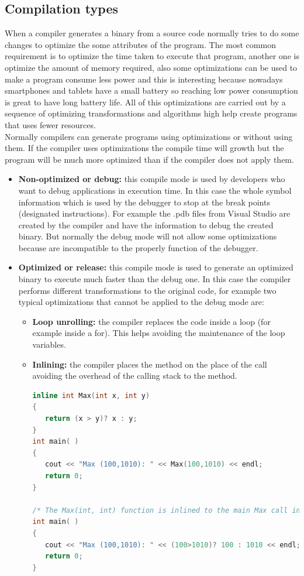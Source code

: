\subsection{Compilation types}\label{SS:PERF-GPIO-comptypes}
When a compiler generates a binary from a source code normally tries to do some changes to optimize the some attributes of the program. The most common requirement is to optimize the time taken to execute that program, another one is optimize the amount of memory required, also some optimizations can be used to make a program consume less power and this is interesting because nowadays smartphones and tablets have a small battery so reaching low power consumption is great to have long battery life. All of this optimizations are carried out by a sequence of optimizing transformations and algorithms high help create programs that uses fewer resources.
\\
Normally compilers can generate programs using optimizations or without using them. If the compiler uses optimizations the compile time will growth but the program will be much more optimized than if the compiler does not apply them.
\begin{itemize}
  \item \textbf{Non-optimized or debug:} this compile mode is used by developers who want to debug applications in execution time. In this case the whole symbol information which is used by the debugger to stop at the break points (designated instructions). For example the .pdb files from Visual Studio are created by the compiler and have the information to debug the created binary. But normally the debug mode will not allow some optimizations because are incompatible to the properly function of the debugger.
  \item \textbf{Optimized or release:} this compile mode is used to generate an optimized binary to execute much faster than the debug one. In this case the compiler performs different transformations to the original code, for example two typical optimizations that cannot be applied to the debug mode are:
  \begin{itemize}
  	\item \textbf{Loop unrolling:} the compiler replaces the code inside a loop (for example inside a for). This helps avoiding the maintenance of the loop variables.
  	\item \textbf{Inlining:} the compiler places the method on the place of the call avoiding the overhead of the calling stack to the method.
  	\begin{lstlisting}[language=C++, caption={Inline example}]
inline int Max(int x, int y)
{
   return (x > y)? x : y;
}
int main( )
{
   cout << "Max (100,1010): " << Max(100,1010) << endl;
   return 0;
}

/* The Max(int, int) function is inlined to the main Max call in the following way:*/
int main( )
{
   cout << "Max (100,1010): " << (100>1010)? 100 : 1010 << endl;
   return 0;
}
\end{lstlisting}
  \end{itemize}
\end{itemize}

